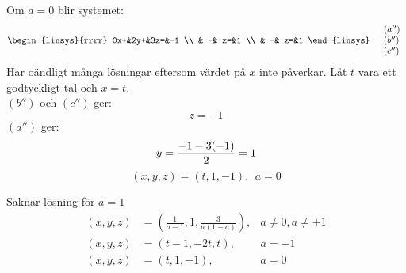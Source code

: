 \begin{task}{1.17}
	Om $a=0$ blir systemet:
	\begin{align*}
		&\begin{linsys}{rrrr}
			0x+&2y+&3z=&-1 \\
			   &  -& z=&1 \\
			   &  -& z=&1
		\end{linsys}
		&\begin{array}{l} 
			(a'') \\ 
			(b'') \\
			(c'')
		\end{array}
	\end{align*}
	Har oändligt många lösningar eftersom värdet på $x$ inte påverkar. Låt $t$ vara ett godtyckligt tal och $x=t$.\\
	$(b'')$ och $(c'')$ ger:
	\[z=-1\]
	$(a'')$ ger:
	\[y=\frac{-1-3\*(-1)}{2}=1\]
	\[(x,y,z)=(t,1,-1),~~a=0\]

	\ans Saknar lösning för $a=1$
	\[
	\begin{array}{rll}
		(x,y,z)&=\left(\frac{1}{a-1},1,\frac{3}{a(1-a)}\right),&a\neq0,a\neq\pm1 \\
		(x,y,z)&=(t-1,-2t,t),&a=-1 \\
		(x,y,z)&=(t,1,-1),&a=0
	\end{array}
	\]
\end{task}

